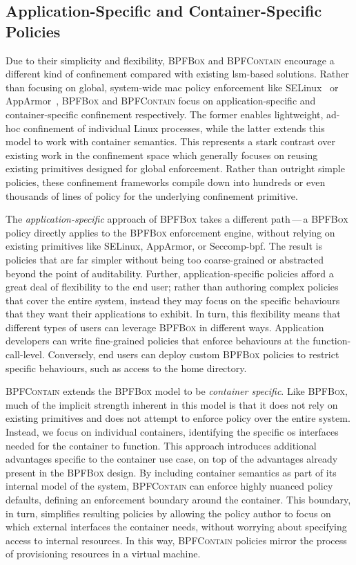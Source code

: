 \documentclass[
  fontsize=12pt,
  titlepage=firstiscover,
  paper=letter,
oneside,
  cleardoublepage=plain,
  parskip=half-,
  DIV=10,
  parindent,
  appendixprefix,
  chapterprefix,
  listof=totoc,
]{scrbook}
\newcommand{\bpfbox}{\textsc{BPFBox}}
\newcommand{\bpfcontain}{\textsc{BPFContain}}
\begin{document}
\subsection{Application-Specific and Container-Specific Policies}

Due to their simplicity and flexibility, \bpfbox{} and \bpfcontain{} encourage a different
kind of confinement compared with existing \gls{lsm}-based solutions. Rather than focusing
on global, system-wide \gls{mac} policy enforcement like
SELinux~\cite{smalley2001_selinux} or AppArmor~\cite{cowan2000_apparmor}, \bpfbox{} and
\bpfcontain{} focus on application-specific and container-specific confinement
respectively. The former enables lightweight, ad-hoc confinement of individual Linux
processes, while the latter extends this model to work with container semantics.  This
represents a stark contrast over existing work in the confinement space which generally
focuses on reusing existing primitives designed for global enforcement.  Rather than
outright simple policies, these confinement frameworks compile down into hundreds or even
thousands of lines of policy for the underlying confinement primitive.

The \textit{application-specific} approach of \bpfbox{} takes a different path\,---\,a
\bpfbox{} policy directly applies to the \bpfbox{} enforcement engine, without relying on
existing primitives like SELinux, AppArmor, or Seccomp-bpf. The result is policies that
are far simpler without being too coarse-grained or abstracted beyond the point of
auditability. Further, application-specific policies afford a great deal of flexibility to
the end user; rather than authoring complex policies that cover the entire system, instead
they may focus on the specific behaviours that they want their applications to exhibit. In
turn, this flexibility means that different types of users can leverage \bpfbox{} in
different ways.  Application developers can write fine-grained policies that enforce
behaviours at the function-call-level.  Conversely, end users can deploy custom \bpfbox{}
policies to restrict specific behaviours, such as access to the home directory.

\bpfcontain{} extends the \bpfbox{} model to be \textit{container specific}. Like
\bpfbox{}, much of the implicit strength inherent in this model is that it does not rely
on existing primitives and does not attempt to enforce policy over the entire system.
Instead, we focus on individual containers, identifying the specific \gls{os} interfaces
needed for the container to function.  This approach introduces additional advantages
specific to the container use case, on top of the advantages already present in the
\bpfbox{} design. By including container semantics as part of its internal model of the
system, \bpfcontain{} can enforce highly nuanced policy defaults, defining an enforcement
boundary around the container. This boundary, in turn, simplifies resulting policies by
allowing the policy author to focus on which external interfaces the container needs,
without worrying about specifying access to internal resources. In this way, \bpfcontain{}
policies mirror the process of provisioning resources in a virtual machine.
\end{document}
